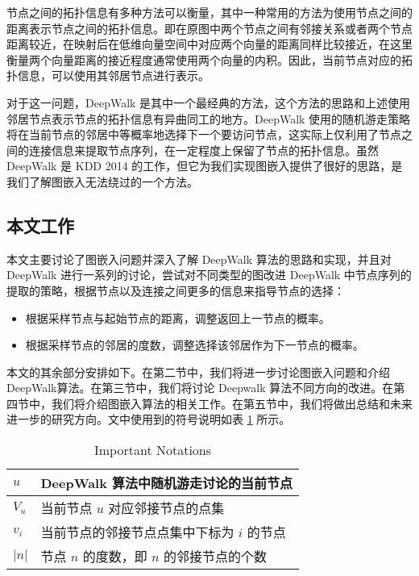 \documentclass{ctexart}
\begin{document}
节点之间的拓扑信息有多种方法可以衡量，其中一种常用的方法为使用节点之间的距离表示节点之间的拓扑信息。即在原图中两个节点之间有邻接关系或者两个节点距离较近，在映射后在低维向量空间中对应两个向量的距离同样比较接近，在这里衡量两个向量距离的接近程度通常使用两个向量的内积。因此，当前节点对应的拓扑信息，可以使用其邻居节点进行表示。


对于这一问题，DeepWalk 是其中一个最经典的方法，这个方法的思路和上述使用邻居节点表示节点的拓扑信息有异曲同工的地方。DeepWalk 使用的随机游走策略将在当前节点的邻居中等概率地选择下一个要访问节点，这实际上仅利用了节点之间的连接信息来提取节点序列，在一定程度上保留了节点的拓扑信息。虽然 DeepWalk\cite{perozzi2014deepwalk} 是 KDD 2014 的工作，但它为我们实现图嵌入提供了很好的思路，是我们了解图嵌入无法绕过的一个方法。

\subsection{本文工作}

本文主要讨论了图嵌入问题并深入了解 DeepWalk 算法的思路和实现，并且对 DeepWalk 进行一系列的讨论，尝试对不同类型的图改进 DeepWalk 中节点序列的提取的策略，根据节点以及连接之间更多的信息来指导节点的选择：

\begin{itemize}
    \item 根据采样节点与起始节点的距离，调整返回上一节点的概率。
    \item 根据采样节点的邻居的度数，调整选择该邻居作为下一节点的概率。
\end{itemize}

本文的其余部分安排如下。在第二节中，我们将进一步讨论图嵌入问题和介绍DeepWalk算法。在第三节中，我们将讨论 Deepwalk 算法不同方向的改进。在第四节中，我们将介绍图嵌入算法的相关工作。在第五节中，我们将做出总结和未来进一步的研究方向。文中使用到的符号说明如表 \ref{notations} 所示。

\begin{table}[!t]
\renewcommand{\arraystretch}{1.1}
\caption{Important Notations}
\label{notations}
\centering
\begin{tabular}{|l|p{}|}
    \hline
    \(u\) & DeepWalk 算法中随机游走讨论的当前节点 \\
    \hline
    \(V_u\) & 当前节点 \(u\) 对应邻接节点的点集 \\
    \hline
    \(v_i\) & 当前节点的邻接节点点集中下标为 \(i\) 的节点 \\
    \hline
    \(|n|\) & 节点 \(n\) 的度数，即 \(n\) 的邻接节点的个数 \\
    \hline
\end{tabular}
\end{table}
\end{document}
